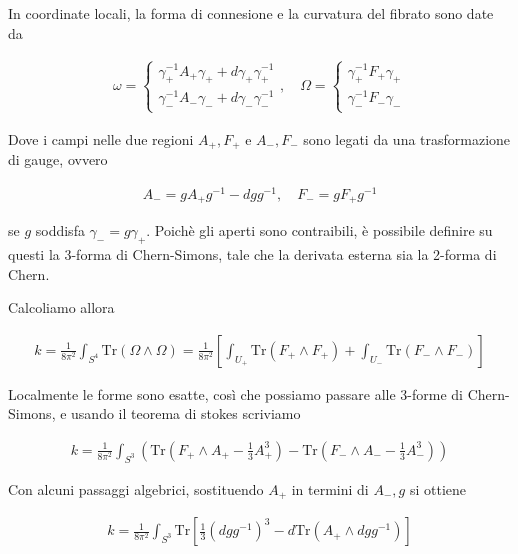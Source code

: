 \documentclass{report}
\begin{document}
In coordinate locali, la forma di connesione e la curvatura del fibrato sono date da 

\begin{align}
    \omega = \begin{cases}
        \gamma_+^{-1}A_+ \gamma_+ + d\gamma_+ \gamma_+^{-1} \\
        \gamma_-^{-1}A_- \gamma_- + d\gamma_- \gamma_-^{-1}
    \end{cases}, 
    \quad 
    \Omega = \begin{cases}
        \gamma_+^{-1}F_+ \gamma_+\\
        \gamma_-^{-1}F_- \gamma_-
    \end{cases}
\end{align}

Dove i campi nelle due regioni \(A_+, F_+\) e \(A_-, F_-\) sono legati da una trasformazione di gauge, ovvero 

\begin{align}
    A_- = gA_+ g^{-1} - dg g^{-1}, \quad F_- = gF_+g^{-1}
\end{align}

se \(g\) soddisfa \(\gamma_- = g\gamma_+\). Poichè gli aperti sono contraibili, è possibile definire su questi la 3-forma di Chern-Simons, tale che la derivata esterna sia la 2-forma di Chern. 

Calcoliamo allora 

\begin{align}
    k = \frac{1}{8\pi^2}\int_{S^4} \text{Tr}(\Omega \wedge \Omega) = \frac{1}{8\pi^2}\left[\int_{U_+} \text{Tr}(F_+ \wedge F_+) + \int_{U_-} \text{Tr}(F_- \wedge F_-)\right]
\end{align}

Localmente le forme sono esatte, così che possiamo passare alle 3-forme di Chern-Simons, e usando il teorema di stokes scriviamo 


\begin{align}
    k = \frac{1}{8\pi^2}\int_{S^3}\left(\text{Tr}\left(F_+ \wedge A_+ - \frac{1}{3}A_+^3\right) - \text{Tr}\left(F_- \wedge A_- - \frac{1}{3}A_-^3\right)\right)
\end{align}

Con alcuni passaggi algebrici, sostituendo \(A_+\) in termini di \(A_-, g\) si ottiene 

\begin{align}
    k = \frac{1}{8\pi^2}\int_{S^3}\text{Tr}\left[\frac{1}{3}(dg g^{-1})^3 - d\text{Tr}(A_+ \wedge dg g^{-1})\right] 
\end{align}
\end{document}
